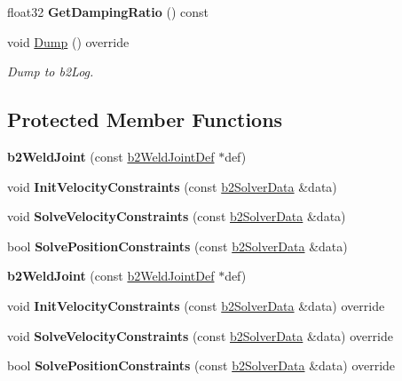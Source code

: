 \begin{DoxyCompactItemize}
\mbox{\label{classb2WeldJoint_a603d83491d474156b2c09b59a23bfca4}} 
float32 {\bfseries Get\+Damping\+Ratio} () const
\item 
\mbox{\label{classb2WeldJoint_a59de1cad3229b41886bc23c4d6216e2f}} 
void \hyperlink{classb2WeldJoint_a59de1cad3229b41886bc23c4d6216e2f}{Dump} () override
\begin{DoxyCompactList}\small\item\em Dump to b2\+Log. \end{DoxyCompactList}\end{DoxyCompactItemize}
\subsection*{Protected Member Functions}
\begin{DoxyCompactItemize}
\item 
\mbox{\label{classb2WeldJoint_a84dbb52e983d9039eab6ad64ae62d8eb}} 
{\bfseries b2\+Weld\+Joint} (const \hyperlink{structb2WeldJointDef}{b2\+Weld\+Joint\+Def} $\ast$def)
\item 
\mbox{\label{classb2WeldJoint_aaf86660bd6dc87dc817c7be675b118e4}} 
void {\bfseries Init\+Velocity\+Constraints} (const \hyperlink{structb2SolverData}{b2\+Solver\+Data} \&data)
\item 
\mbox{\label{classb2WeldJoint_a5c30276fbd7ad15f2641bc571fd97596}} 
void {\bfseries Solve\+Velocity\+Constraints} (const \hyperlink{structb2SolverData}{b2\+Solver\+Data} \&data)
\item 
\mbox{\label{classb2WeldJoint_a21253196937e3f9f6227931dd08d80a3}} 
bool {\bfseries Solve\+Position\+Constraints} (const \hyperlink{structb2SolverData}{b2\+Solver\+Data} \&data)
\item 
\mbox{\label{classb2WeldJoint_a84dbb52e983d9039eab6ad64ae62d8eb}} 
{\bfseries b2\+Weld\+Joint} (const \hyperlink{structb2WeldJointDef}{b2\+Weld\+Joint\+Def} $\ast$def)
\item 
\mbox{\label{classb2WeldJoint_afb54f848fe19f33555f01594e3e4f410}} 
void {\bfseries Init\+Velocity\+Constraints} (const \hyperlink{structb2SolverData}{b2\+Solver\+Data} \&data) override
\item 
\mbox{\label{classb2WeldJoint_a0367580735b117dcf9a4292df4daf883}} 
void {\bfseries Solve\+Velocity\+Constraints} (const \hyperlink{structb2SolverData}{b2\+Solver\+Data} \&data) override
\item 
\mbox{\label{classb2WeldJoint_a068ae45ce6577e27669121032c277015}} 
bool {\bfseries Solve\+Position\+Constraints} (const \hyperlink{structb2SolverData}{b2\+Solver\+Data} \&data) override
\end{DoxyCompactItemize}
